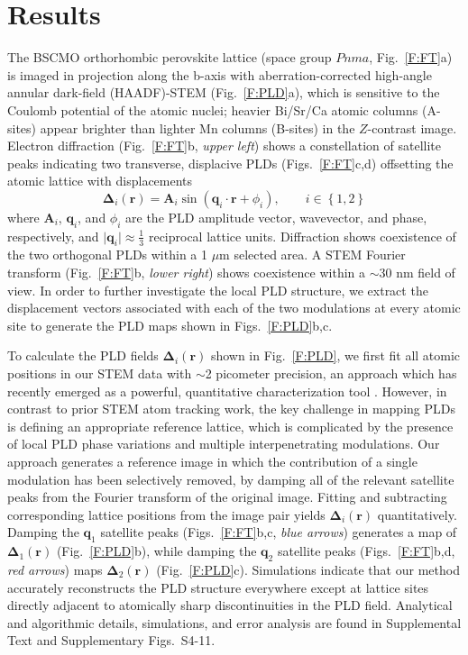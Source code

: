 \documentclass[12pt]{article}
\begin{document}
\section*{Results}

The BSCMO orthorhombic perovskite lattice (space group $Pnma$, Fig.~\ref{F:FT}a) is imaged in projection along the b-axis with aberration-corrected high-angle annular dark-field (HAADF)-STEM (Fig.~\ref{F:PLD}a), which is sensitive to the Coulomb potential of the atomic nuclei;
heavier Bi/Sr/Ca atomic columns (A-sites) appear brighter than lighter Mn columns (B-sites) in the $Z$-contrast image.
Electron diffraction (Fig.~\ref{F:FT}b, \textit{upper left}) shows a constellation of satellite peaks indicating two transverse, displacive PLDs (Figs.~\ref{F:FT}c,d) offsetting the atomic lattice with displacements
\begin{equation}
\label{E:modulation_field}
\mathbf{\Delta}_{i}(\mathbf{r}) = \mathbf{A}_{i}\sin\left( \mathbf{q}_i\cdot\mathbf{r} + \phi_{i} \right), \qquad i\in\left\{1,2\right\}
\end{equation}
where $\mathbf{A}_i$, $\mathbf{q}_i$, and $\phi_i$ are the PLD amplitude vector, wavevector, and phase, respectively, and $\lvert\mathbf{q}_i\rvert\approx\frac{1}{3}$ reciprocal lattice units.
Diffraction shows coexistence of the two orthogonal PLDs within a 1 $\mu$m selected area.
A STEM Fourier transform (Fig.~\ref{F:FT}b, \textit{lower right}) shows coexistence within a $\sim$30 nm field of view.
In order to further investigate the local PLD structure, we extract the displacement vectors associated with each of the two modulations at every atomic site to generate the PLD maps shown in Figs.~\ref{F:PLD}b,c.


To calculate the PLD fields $\mathbf{\Delta}_i(\mathbf{r})$ shown in Fig.~\ref{F:PLD}, we first fit all atomic positions in our STEM data with $\sim$2 picometer precision, an approach which has recently emerged as a powerful, quantitative characterization tool \cite{Nelson2011,Yankovich2014,Yadav2016}.
However, in contrast to prior STEM atom tracking work, the key challenge in mapping PLDs is defining an appropriate reference lattice, which is complicated by the presence of local PLD phase variations and multiple interpenetrating modulations.
Our approach generates a reference image in which the contribution of a single modulation has been selectively removed, by damping all of the relevant satellite peaks from the Fourier transform of the original image.
Fitting and subtracting corresponding lattice positions from the image pair yields $\mathbf{\Delta}_{i}(\mathbf{r})$ quantitatively.
Damping the $\mathbf{q}_1$ satellite peaks (Figs.~\ref{F:FT}b,c, \textit{blue arrows}) generates a map of $\mathbf{\Delta}_1(\mathbf{r})$ (Fig.~\ref{F:PLD}b), while damping the $\mathbf{q}_2$ satellite peaks (Figs.~\ref{F:FT}b,d, \textit{red arrows}) maps $\mathbf{\Delta}_2(\mathbf{r})$ (Fig.~\ref{F:PLD}c).
Simulations indicate that our method accurately reconstructs the PLD structure everywhere except at lattice sites directly adjacent to atomically sharp discontinuities in the PLD field.
Analytical and algorithmic details, simulations, and error analysis are found in Supplemental Text and Supplementary Figs.~S4-11.
\end{document}
